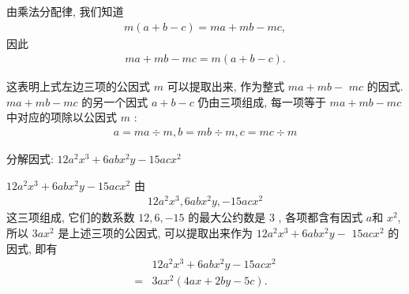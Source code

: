 由乘法分配律, 我们知道
\begin{align*}
	m(a+b-c)=m a+m b-m c,
\end{align*}
因此
\begin{align*}
	m a+m b-m c=m(a+b-c) .
\end{align*}

这表明上式左边三项的公因式 $m$ 可以提取出来, 作为整式 $m a+m b-$ $m c$ 的因式. $m a+m b-m c$ 的另一个因式 $a+b-c$ 仍由三项组成, 每一项等于 $m a+m b-m c$ 中对应的项除以公因式 $m$ :
\begin{align*}
	a=m a \div m, b=m b \div m, c=m c \div m
\end{align*}

\begin{example}[一次提净]\label{ex:提公因式-例1-一次提净}
	分解因式: $12 a^{2} x^{3}+6 a b x^{2} y-15 a c x^{2}$
\end{example}
\begin{solution}
	$12 a^{2} x^{3}+6 a b x^{2} y-15 a c x^{2}$ 由
	\begin{align*}
		12 a^{2} x^{3}, 6 a b x^{2} y,-15 a c x^{2}
	\end{align*}
	这三项组成, 它们的数系数 $12 ,  6 , -15$ 的最大公约数是 3 , 各项都含有因式 $a$和 $x^{2}$, 所以 $3 a x^{2}$ 是上述三项的公因式, 可以提取出来作为 $12 a^{2} x^{3}+6 a b x^{2} y-$ $15 a c x^{2}$ 的因式, 即有
	\begin{align*}
		  & 12 a^{2} x^{3}+6 a b x^{2} y-15 a c x^{2} \\
		= & 3 a x^{2}(4 a x+2 b y-5 c) .
	\end{align*}
\end{solution}
